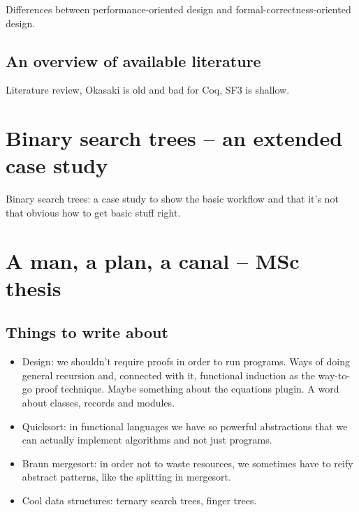 \documentclass[declaration,mgr,english,shortabstract]{iithesis}
\begin{document}
Differences between performance-oriented design and formal-correctness-oriented design.

\section{An overview of available literature}

Literature review, Okasaki is old and bad for Coq, SF3 is shallow.

\chapter{Binary search trees -- an extended case study} \label{ch2}

Binary search trees: a case study to show the basic workflow and that it's not that obvious how to get basic stuff right.

\chapter{A man, a plan, a canal -- MSc thesis}

\section{Things to write about}
\begin{itemize}
    \item Design: we shouldn't require proofs in order to run programs. Ways of doing general recursion and, connected with it, functional induction as the way-to-go proof technique. Maybe something about the equations plugin. A word about classes, records and modules.
    \item Quicksort: in functional languages we have so powerful abstractions that we can actually implement \*algorithms\* and not just programs.
    \item  Braun mergesort: in order not to waste resources, we sometimes have to reify abstract patterns, like the splitting in mergesort.
    \item Cool data structures: ternary search trees, finger trees.
\end{itemize}

\end{document}
